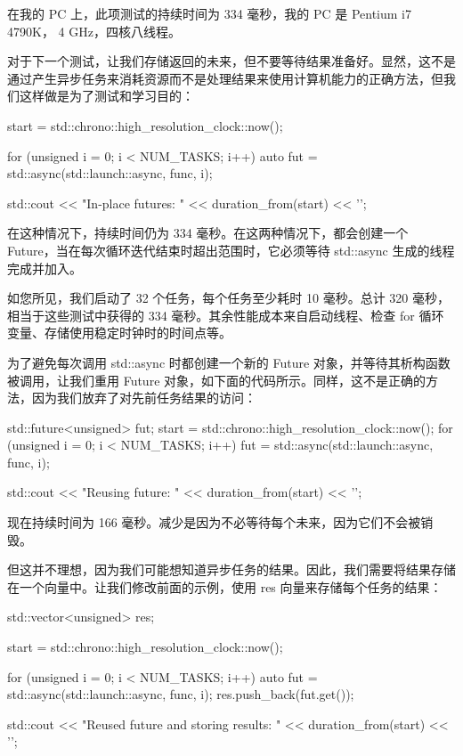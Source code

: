 在我的 PC 上，此项测试的持续时间为 334 毫秒，我的 PC 是 Pentium i7 4790K， 4 GHz，四核八线程。

对于下一个测试，让我们存储返回的未来，但不要等待结果准备好。显然，这不是通过产生异步任务来消耗资源而不是处理结果来使用计算机能力的正确方法，但我们这样做是为了测试和学习目的：

\begin{cpp}
start = std::chrono::high_resolution_clock::now();

for (unsigned i = 0; i < NUM_TASKS; i++) {
    auto fut = std::async(std::launch::async, func, i);
}

std::cout << "In-place futures: "
          << duration_from(start) << '\n';
\end{cpp}

在这种情况下，持续时间仍为 334 毫秒。在这两种情况下，都会创建一个 Future，当在每次循环迭代结束时超出范围时，它必须等待 std::async 生成的线程完成并加入。

如您所见，我们启动了 32 个任务，每个任务至少耗时 10 毫秒。总计 320 毫秒，相当于这些测试中获得的 334 毫秒。其余性能成本来自启动线程、检查 for 循环变量、存储使用稳定时钟时的时间点等。

为了避免每次调用 std::async 时都创建一个新的 Future 对象，并等待其析构函数被调用，让我们重用 Future 对象，如下面的代码所示。同样，这不是正确的方法，因为我们放弃了对先前任务结果的访问：

\begin{cpp}
std::future<unsigned> fut;
start = std::chrono::high_resolution_clock::now();
for (unsigned i = 0; i < NUM_TASKS; i++) {
    fut = std::async(std::launch::async, func, i);
}

std::cout << "Reusing future: "
          << duration_from(start) << '\n';
\end{cpp}

现在持续时间为 166 毫秒。减少是因为不必等待每个未来，因为它们不会被销毁。

但这并不理想，因为我们可能想知道异步任务的结果。因此，我们需要将结果存储在一个向量中。让我们修改前面的示例，使用 res 向量来存储每个任务的结果：

\begin{cpp}
std::vector<unsigned> res;

start = std::chrono::high_resolution_clock::now();

for (unsigned i = 0; i < NUM_TASKS; i++) {
    auto fut = std::async(std::launch::async, func, i);
    res.push_back(fut.get());
}

std::cout << "Reused future and storing results: "
          << duration_from(start) << '\n';
\end{cpp}

